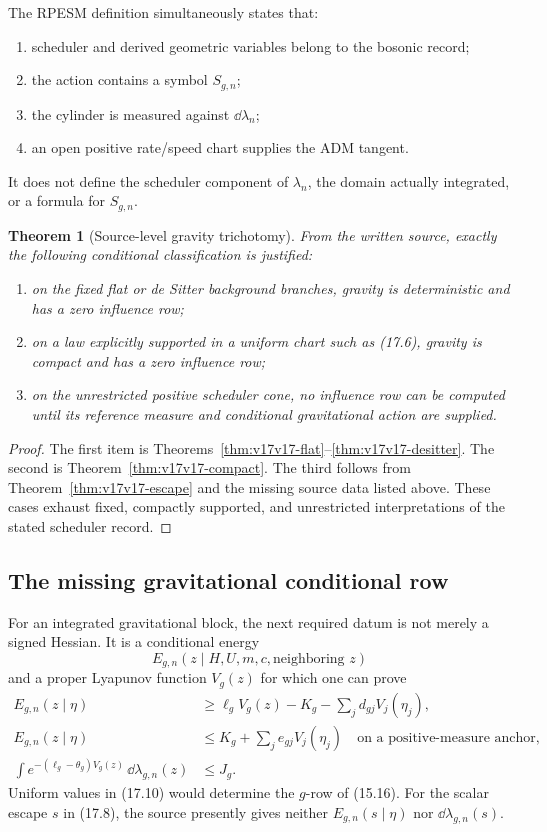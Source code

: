 \documentclass[11pt]{article}
\newtheorem{theorem}{Theorem}[section]
\theoremstyle{remark}
\begin{document}
The RPESM definition simultaneously states that:
\begin{enumerate}
\item scheduler and derived geometric variables belong to the
      bosonic record;
\item the action contains a symbol \(S_{g,n}\);
\item the cylinder is measured against \(\dd\lambda_n\);
\item an open positive rate/speed chart supplies the ADM tangent.
\end{enumerate}
It does not define the scheduler component of \(\lambda_n\), the
domain actually integrated, or a formula for \(S_{g,n}\).

\begin{theorem}[Source-level gravity trichotomy]
\label{thm:v17v17-trichotomy}
From the written source, exactly the following conditional
classification is justified:
\begin{enumerate}
\item on the fixed flat or de Sitter background branches, gravity
      is deterministic and has a zero influence row;
\item on a law explicitly supported in a uniform chart such as
      (17.6), gravity is compact and has a zero influence row;
\item on the unrestricted positive scheduler cone, no influence
      row can be computed until its reference measure and
      conditional gravitational action are supplied.
\end{enumerate}
\end{theorem}

\begin{proof}
The first item is
Theorems~\ref{thm:v17v17-flat}--\ref{thm:v17v17-desitter}.
The second is Theorem~\ref{thm:v17v17-compact}.  The third follows
from Theorem~\ref{thm:v17v17-escape} and the missing source data
listed above.  These cases exhaust fixed, compactly supported, and
unrestricted interpretations of the stated scheduler record.
\end{proof}

\subsection{The missing gravitational conditional row}

For an integrated gravitational block, the next required datum is
not merely a signed Hessian.  It is a conditional energy
\[
 E_{g,n}(z\mid H,U,m,c,\text{neighboring }z)        \tag{17.9}
\]
and a proper Lyapunov function \(V_g(z)\) for which one can prove
\[
\begin{aligned}
 E_{g,n}(z\mid\eta)
 &\geq\ell_gV_g(z)-K_g-\sum_jd_{gj}V_j(\eta_j),\\
 E_{g,n}(z\mid\eta)
 &\leq K_g+\sum_je_{gj}V_j(\eta_j)
 \quad\text{on a positive-measure anchor},         \tag{17.10}\\
 \int e^{-(\ell_g-\theta_g)V_g(z)}\,\dd\lambda_{g,n}(z)
 &\leq J_g.
\end{aligned}
\]
Uniform values in (17.10) would determine the \(g\)-row of (15.16).
For the scalar escape \(s\) in (17.8), the source presently gives
neither \(E_{g,n}(s\mid\eta)\) nor
\(\dd\lambda_{g,n}(s)\).
\end{document}
